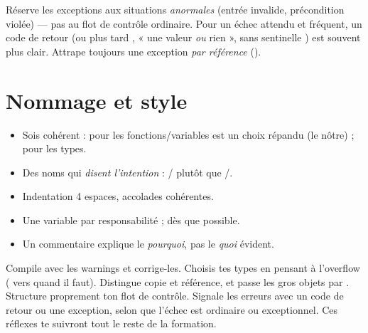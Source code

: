 \documentclass[11pt]{article}
\begin{document}
\begin{aretenir}
Réserve les exceptions aux situations \emph{anormales} (entrée invalide,
précondition violée) — pas au flot de contrôle ordinaire. Pour un échec attendu
et fréquent, un code de retour (ou plus tard , « une
valeur \emph{ou} rien », sans sentinelle ) est souvent plus clair.
Attrape toujours une exception \emph{par  référence}
().
\end{aretenir}

\section{Nommage et style}

\begin{itemize}[noitemsep]
    \item Sois cohérent :  pour les fonctions/variables est un
          choix répandu (le nôtre) ;  pour les types.
    \item Des noms qui \emph{disent l'intention} : /
          plutôt que /.
    \item Indentation 4 espaces, accolades cohérentes.
    \item Une variable par responsabilité ;  dès que possible.
    \item Un commentaire explique le \emph{pourquoi}, pas le \emph{quoi} évident.
\end{itemize}

\begin{aretenir}
Compile avec les warnings et corrige-les. Choisis tes types en pensant à
l'overflow ( vers  quand il faut). Distingue
copie et référence, et passe les gros objets par . Structure
proprement ton flot de contrôle. Signale les erreurs avec un code de retour ou
une exception, selon que l'échec est ordinaire ou exceptionnel. Ces réflexes te
suivront tout le reste de la formation.
\end{aretenir}
\end{document}
